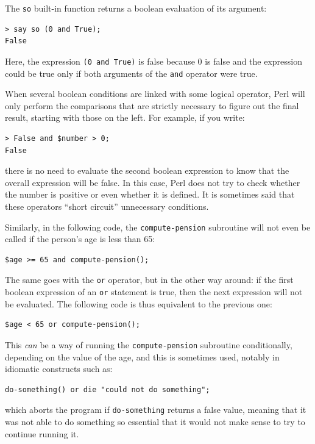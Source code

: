 The {\tt so} built-in function returns a boolean evaluation of 
its argument:

\begin{verbatim}
> say so (0 and True);
False
\end{verbatim}
%
Here, the expression {\tt (0 and True)} is false because 0 
is false and the expression could be true only if both arguments 
of the {\tt and} operator were true.

When several boolean conditions are linked with some logical 
operator, Perl will only perform the comparisons that are 
strictly necessary to figure out the final result, starting 
with those on the left. For example, if you write:

\begin{verbatim}
> False and $number > 0;
False
\end{verbatim}
%
there is no need to evaluate the second boolean expression 
to know that the overall expression will be false. In this case, 
Perl does not try to check whether the number is positive or 
even whether it is defined. It is sometimes said that 
these operators ``short circuit'' unnecessary conditions.

Similarly, in the following code, the {\tt compute-pension} 
subroutine will not even be called if the person's age is 
less than 65:

\begin{verbatim}
$age >= 65 and compute-pension();
\end{verbatim}
%
The same goes with the {\tt or} operator, but in the other way 
around: if the first boolean expression of an {\tt or} 
statement is true, then the next expression will not be 
evaluated. The following code is thus equivalent to the previous 
one:

\begin{verbatim}
$age < 65 or compute-pension();
\end{verbatim}
% 
This \emph{can} be a way of running the {\tt compute-pension} 
subroutine conditionally, depending on the value of the age, and 
this is sometimes used, notably in idiomatic constructs such as:

\begin{verbatim}
do-something() or die "could not do something";
\end{verbatim}
%
which aborts the program if {\tt do-something} returns a false 
value, meaning that it was not able to do something 
so essential that it would not make sense to try to continue 
running it.

